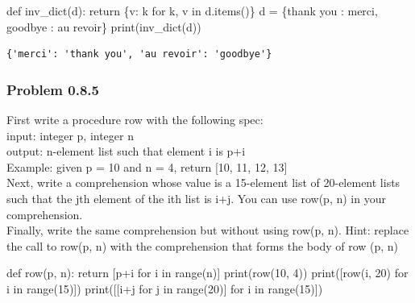 \documentclass[
  letterpaper,
  DIV=11,
  numbers=noendperiod]{scrartcl}
\newenvironment{Shaded}{\begin{snugshade}}{\end{snugshade}}
\newcommand{\BuiltInTok}[1]{\textcolor[rgb]{0.00,0.23,0.31}{#1}}
\newcommand{\ControlFlowTok}[1]{\textcolor[rgb]{0.00,0.23,0.31}{#1}}
\newcommand{\DecValTok}[1]{\textcolor[rgb]{0.68,0.00,0.00}{#1}}
\newcommand{\KeywordTok}[1]{\textcolor[rgb]{0.00,0.23,0.31}{#1}}
\newcommand{\NormalTok}[1]{\textcolor[rgb]{0.00,0.23,0.31}{#1}}
\newcommand{\OperatorTok}[1]{\textcolor[rgb]{0.37,0.37,0.37}{#1}}
\newcommand{\StringTok}[1]{\textcolor[rgb]{0.13,0.47,0.30}{#1}}
\begin{document}
\begin{Shaded}
\begin{Highlighting}[numbers=left,,]
\KeywordTok{def}\NormalTok{ inv\_dict(d): }\ControlFlowTok{return}\NormalTok{ \{v: k }\ControlFlowTok{for}\NormalTok{ k, v }\KeywordTok{in}\NormalTok{ d.items()\}}
\NormalTok{d }\OperatorTok{=}\NormalTok{ \{}\StringTok{\textquotesingle{}thank you\textquotesingle{}}\NormalTok{ : }\StringTok{\textquotesingle{}merci\textquotesingle{}}\NormalTok{, }\StringTok{\textquotesingle{}goodbye\textquotesingle{}}\NormalTok{ : }\StringTok{\textquotesingle{}au revoir\textquotesingle{}}\NormalTok{\}}
\BuiltInTok{print}\NormalTok{(inv\_dict(d))}
\end{Highlighting}
\end{Shaded}

\begin{verbatim}
{'merci': 'thank you', 'au revoir': 'goodbye'}
\end{verbatim}

\hypertarget{problem-0.8.5}{%
\subsubsection{Problem 0.8.5}\label{problem-0.8.5}}

First write a procedure row with the following spec:\\
input: integer p, integer n\\
output: n-element list such that element i is p+i\\
Example: given p = 10 and n = 4, return {[}10, 11, 12, 13{]}\\
Next, write a comprehension whose value is a 15-element list of
20-element lists such that the jth element of the ith list is i+j. You
can use row(p, n) in your comprehension.\\
Finally, write the same comprehension but without using row(p, n). Hint:
replace the call to row(p, n) with the comprehension that forms the body
of row (p, n)\\

\begin{Shaded}
\begin{Highlighting}[numbers=left,,]
\KeywordTok{def}\NormalTok{ row(p, n): }\ControlFlowTok{return}\NormalTok{ [p}\OperatorTok{+}\NormalTok{i }\ControlFlowTok{for}\NormalTok{ i }\KeywordTok{in} \BuiltInTok{range}\NormalTok{(n)]}
\BuiltInTok{print}\NormalTok{(row(}\DecValTok{10}\NormalTok{, }\DecValTok{4}\NormalTok{))}
\BuiltInTok{print}\NormalTok{([row(i, }\DecValTok{20}\NormalTok{) }\ControlFlowTok{for}\NormalTok{ i }\KeywordTok{in} \BuiltInTok{range}\NormalTok{(}\DecValTok{15}\NormalTok{)])}
\BuiltInTok{print}\NormalTok{([[i}\OperatorTok{+}\NormalTok{j }\ControlFlowTok{for}\NormalTok{ j }\KeywordTok{in} \BuiltInTok{range}\NormalTok{(}\DecValTok{20}\NormalTok{)] }\ControlFlowTok{for}\NormalTok{ i }\KeywordTok{in} \BuiltInTok{range}\NormalTok{(}\DecValTok{15}\NormalTok{)])}
\end{Highlighting}
\end{Shaded}
\end{document}
